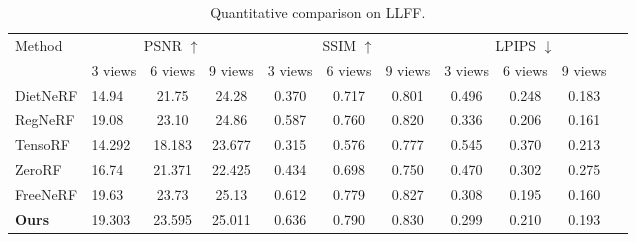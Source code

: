 \begin{table*}[t]
	\centering
	\caption{Quantitative comparison on LLFF.}
	\label{tab:llff_comparison}
	\begin{tabular}{l lccccccccc}
		\toprule
		\multirow{2}{*}{Method} & \multicolumn{3}{c}{PSNR $\uparrow$} & \multicolumn{3}{c}{SSIM $\uparrow$} & \multicolumn{3}{c}{LPIPS $\downarrow$} \\
		\cmidrule(lr){2-4} \cmidrule(lr){5-7} \cmidrule(lr){8-10}
		& 3 views & 6 views & 9 views & 3 views & 6 views & 9 views & 3 views & 6 views & 9 views \\
		\midrule
		DietNeRF \cite{jain2021putting} & 14.94 & 21.75 & 24.28 & 0.370 & 0.717 & 0.801 & 0.496 & 0.248 & 0.183 \\
		RegNeRF \cite{niemeyer2022regnerf}& \cellcolor{yellow!25}19.08 & \cellcolor{yellow!25}23.10 & \cellcolor{yellow!25}24.86 & \cellcolor{yellow!25}0.587 & \cellcolor{yellow!25}0.760 &\cellcolor{yellow!25} 0.820 & \cellcolor{yellow!25} 0.336 &  \cellcolor{orange!25}0.206 &  \cellcolor{orange!25} 0.161 \\
		\midrule
		TensoRF \cite{Chen2022ECCV} & 14.292 & 18.183 & 23.677 & 0.315 & 0.576   & 0.777  & 0.545  & 0.370 & 0.213\\
		\midrule
		ZeroRF \cite{shi2024zerorf} & 16.74 & 21.371 & 22.425 & 0.434 &0.698 & 0.750 &  0.470 & 0.302 & 0.275 \\
		FreeNeRF \cite{yang2023freenerf}& \cellcolor{red!25} 19.63 & \cellcolor{red!25} 23.73 & \cellcolor{red!25} 25.13 &  \cellcolor{orange!25}0.612 &  \cellcolor{orange!25}0.779 &  \cellcolor{orange!25}0.827 &  \cellcolor{orange!25}0.308 & \cellcolor{red!25} 0.195 & \cellcolor{red!25}0.160 \\
		\midrule
		\textbf{Ours} &  \cellcolor{orange!25} 19.303 & \cellcolor{orange!25} 23.595 &  \cellcolor{orange!25}25.011 & \cellcolor{red!25} 0.636 & \cellcolor{red!25} 0.790 & \cellcolor{red!25} 0.830 & \cellcolor{red!25} 0.299 &  \cellcolor{yellow!25}0.210 &  \cellcolor{yellow!25}0.193  \\
		\bottomrule
	\end{tabular}
\end{table*}


